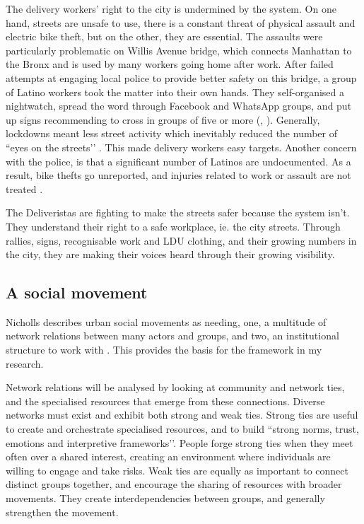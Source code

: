 \documentclass{article}[12pt]
\begin{document}
The delivery workers’ right to the city is undermined by the system. On one hand, streets are unsafe to use, there is a constant threat of physical assault and electric bike theft, but on the other, they are essential. 
The assaults were particularly problematic on Willis Avenue bridge, which connects Manhattan to the Bronx and is used by many workers going home after work. After failed attempts at engaging local police to provide better safety on this bridge, a group of Latino workers took the matter into their own hands. They self-organised a nightwatch, spread the word through Facebook and WhatsApp groups, and put up signs recommending to cross in groups of five or more (\parencite{vox2021}, \parencite{curbed2021}). 
Generally, lockdowns meant less street activity which inevitably reduced the number of ``eyes on the streets’’ \parencite{jacobs2007uses}. This made delivery workers easy targets.
Another concern with the police, is that a significant number of Latinos are undocumented. As a result, bike thefts go unreported, and injuries related to work or assault are not treated \parencite{brictv}.

The Deliveristas are fighting to make the streets safer because the system isn't. They understand their right to a safe workplace, ie. the city streets. Through rallies, signs, recognisable work and LDU clothing, and their growing numbers in the city, they are making their voices heard through their growing visibility.

\subsection{A social movement}

Nicholls describes urban social movements as needing, one, a multitude of network relations between many actors and groups, and two, an institutional structure to work with \parencite{nicholls2008urban}.
This provides the basis for the framework in my research. 

Network relations will be analysed by looking at community and network ties, and the specialised resources that emerge from these connections.
Diverse networks must exist and exhibit both strong and weak ties. Strong ties are useful to create and orchestrate specialised resources, and to build ``strong norms, trust, emotions and interpretive frameworks’’\parencite{nicholls2008urban}. People forge strong ties when they meet often over a shared interest, creating an environment where individuals are willing to engage and take risks.
Weak ties are equally as important to connect distinct groups together, and encourage the sharing of resources with broader movements. They create interdependencies between groups, and generally strengthen the movement.
\end{document}
